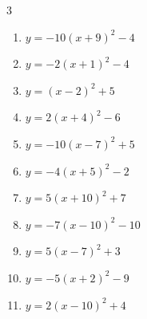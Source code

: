 \begin{multicols}{3}
\begin{enumerate}
  \item $\displaystyle y=-10\left( x+9\right)^{2}-4$

        \phantom{$\displaystyle 頂点\left( -9 , -4 \right)$}

  \item $\displaystyle y=-2\left( x+1\right)^{2}-4$

        \phantom{$\displaystyle 頂点\left( -1 , -4 \right)$}

  \item $\displaystyle y=\left( x-2\right)^{2}+5$

        \phantom{$\displaystyle 頂点\left( 2 , 5 \right)$}

  \item $\displaystyle y=2\left( x+4\right)^{2}-6$

        \phantom{$\displaystyle 頂点\left( -4 , -6 \right)$}

  \item $\displaystyle y=-10\left( x-7\right)^{2}+5$

        \phantom{$\displaystyle 頂点\left( 7 , 5 \right)$}

  \item $\displaystyle y=-4\left( x+5\right)^{2}-2$

        \phantom{$\displaystyle 頂点\left( -5 , -2 \right)$}

  \item $\displaystyle y=5\left( x+10\right)^{2}+7$

        \phantom{$\displaystyle 頂点\left( -10 , 7 \right)$}

  \item $\displaystyle y=-7\left( x-10\right)^{2}-10$

        \phantom{$\displaystyle 頂点\left( 10 , -10 \right)$}

  \item $\displaystyle y=5\left( x-7\right)^{2}+3$

        \phantom{$\displaystyle 頂点\left( 7 , 3 \right)$}

  \item $\displaystyle y=-5\left( x+2\right)^{2}-9$

        \phantom{$\displaystyle 頂点\left( -2 , -9 \right)$}

\columnbreak %

  \item $\displaystyle y=2\left( x-10\right)^{2}+4$

        \phantom{$\displaystyle 頂点\left( 10 , 4 \right)$}


\end{enumerate}
\end{multicols}
